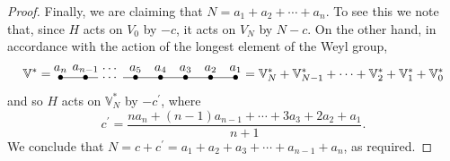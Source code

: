 \documentclass[11pt]{article}
\begin{document}
\begin{proof}
Finally, we are claiming that $N=a_1+a_2+\cdots+a_n$. To see this we note that,
since $H$ acts on $V_0$ by $-c$, it acts on $V_N$ by $N-c$. On the other hand,
in accordance with the action of the longest element of the Weyl group,
\[{\mathbb{V}}^*=\enskip\raisebox{-5pt}{\begin{picture}(140,17)
\put(0,5){\makebox(0,0){$\bullet$}}
\put(20,5){\makebox(0,0){$\bullet$}}
\put(60,5){\makebox(0,0){$\bullet$}}
\put(80,5){\makebox(0,0){$\bullet$}}
\put(100,5){\makebox(0,0){$\bullet$}}
\put(120,5){\makebox(0,0){$\bullet$}}
\put(140,5){\makebox(0,0){$\bullet$}}
\put(0,5){\line(1,0){30}}
\put(40,5){\makebox(0,0){\scriptsize$\cdots$}}
\put(50,5){\line(1,0){90}}
\put(0,12){\makebox(0,0){\scriptsize$a_n$}}
\put(20,12){\makebox(0,0){\scriptsize$a_{n-1}$}}
\put(40,12){\makebox(0,0){\scriptsize$\cdots$}}
\put(60,12){\makebox(0,0){\scriptsize$a_5$}}
\put(80,12){\makebox(0,0){\scriptsize$a_4$}}
\put(100,12){\makebox(0,0){\scriptsize$a_3$}}
\put(120,12){\makebox(0,0){\scriptsize$a_2$}}
\put(140,12){\makebox(0,0){\scriptsize$a_1$}}
\end{picture}}\enskip={\mathbb{V}}_N^*+{\mathbb{V}}_{N-1}^*+\cdots+
{\mathbb{V}}_2^*+{\mathbb{V}}_1^*+{\mathbb{V}}_0^*\]
and so $H$ acts on ${\mathbb{V}}_N^*$ by $-c^\prime$, where
\[c^\prime=\frac{na_n+(n-1)a_{n-1}+\cdots+3a_3+2a_2+a_1}{n+1}.\]
We conclude that $N=c+c^\prime=a_1+a_2+a_3+\cdots+a_{n-1}+a_n$, as required.
\end{proof}
\end{document}
